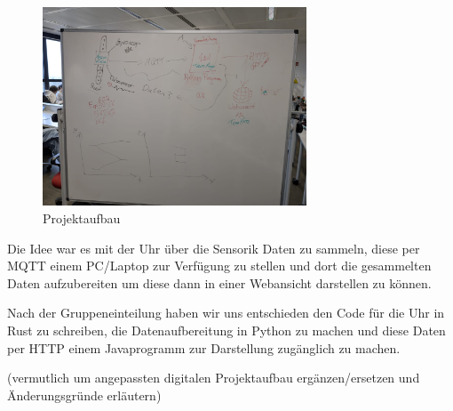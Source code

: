 \documentclass[a4paper, 11pt]{article}
\begin{document}
\begin{figure}[H]
    \centering
    \includegraphics[width=0.7\textwidth]{images/Projektaufbau.jpeg}
    \caption{Projektaufbau}
    \label{fig:Projektaufbau}
\end{figure}
\noindent Die Idee war es mit der Uhr über die Sensorik Daten zu sammeln, diese per MQTT einem PC/Laptop zur Verfügung zu stellen und dort die gesammelten Daten aufzubereiten um diese dann in einer Webansicht darstellen zu können.

\noindent Nach der Gruppeneinteilung haben wir uns entschieden den Code für die Uhr in Rust zu schreiben, die Datenaufbereitung in Python zu machen und diese Daten per HTTP einem Javaprogramm zur Darstellung zugänglich zu machen.

\noindent (vermutlich um angepassten digitalen Projektaufbau ergänzen/ersetzen und Änderungsgründe erläutern)


\clearpage
\end{document}
